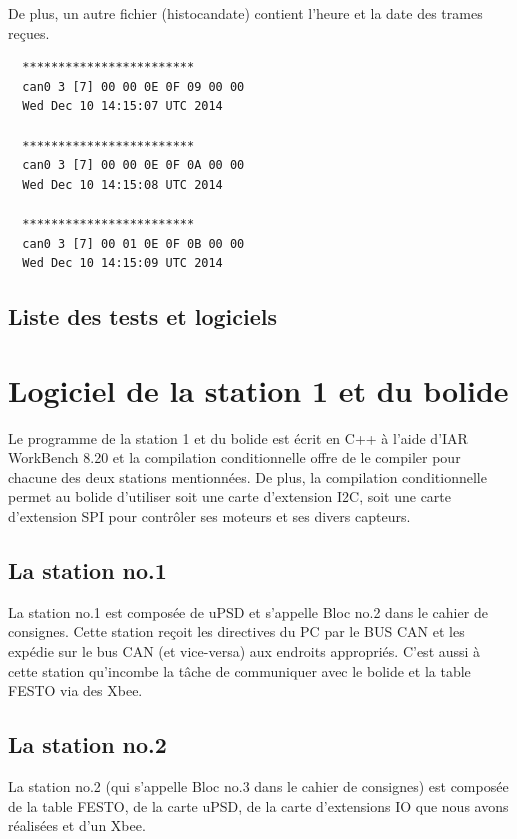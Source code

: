 \documentclass[10pt,a4paper,final]{article}
\begin{document}
De plus, un autre fichier (histocandate) contient l'heure et la date des trames reçues.
\begin{verbatim}
  ************************
  can0 3 [7] 00 00 0E 0F 09 00 00
  Wed Dec 10 14:15:07 UTC 2014
 
  ************************
  can0 3 [7] 00 00 0E 0F 0A 00 00
  Wed Dec 10 14:15:08 UTC 2014
 
  ************************
  can0 3 [7] 00 01 0E 0F 0B 00 00
  Wed Dec 10 14:15:09 UTC 2014
\end{verbatim} 
\begin{spacing}{1.5}
\vfill
\pagebreak
\subsection{Liste des tests et logiciels}






\pagebreak
\section{Logiciel de la station 1 et du bolide}
Le programme de la station 1 et du bolide est écrit en C++ à l'aide d'IAR WorkBench 8.20 et la compilation conditionnelle offre de le compiler pour chacune des deux stations mentionnées. De plus, la compilation conditionnelle permet au bolide d'utiliser soit une carte d'extension I2C, soit une carte d'extension SPI pour contrôler ses moteurs et ses divers capteurs.

\subsection{La station no.1}
La station no.1 est composée de uPSD et s'appelle Bloc no.2 dans le cahier de consignes. Cette station reçoit les directives du PC par le BUS CAN et les expédie sur le bus CAN (et vice-versa) aux endroits appropriés. C'est aussi à cette station qu'incombe la tâche de communiquer avec le bolide et la table FESTO via des Xbee.

\subsection{La station no.2}
La station no.2 (qui s'appelle Bloc no.3 dans le cahier de consignes) est composée de la table FESTO, de la carte uPSD, de la carte d'extensions IO que nous avons réalisées et d'un Xbee.
\pagebreak

\begin{figure}[hbtp]

\end{figure}
\end{spacing}
\end{document}
